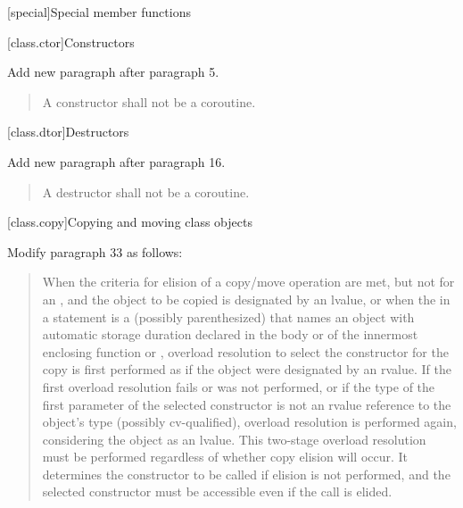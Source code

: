 
\setcounter{chapter}{11}
[special]{Special member functions}

\cbstart
{}

\begin{quote}
	\setcounter{Paras}{5} 
\end{quote}

\setcounter{section}{0}
[class.ctor]{Constructors}%

Add new paragraph after paragraph 5.

	\setcounter{Paras}{5}
\begin{quote}
	\pnum A constructor shall not be a coroutine.
\end{quote}

\setcounter{section}{3}
[class.dtor]{Destructors}%

Add new paragraph after paragraph 16.

	\setcounter{Paras}{16}
\begin{quote}
	\pnum A destructor shall not be a coroutine.
\end{quote}
\cbend

\setcounter{section}{7}
[class.copy]{Copying and moving class objects}%

Modify paragraph 33 as follows:

\begin{quote}
\setcounter{Paras}{32}
\pnum
When the criteria for elision of a copy/move operation are met,
but not for an ,
and the object
to be copied is designated by an lvalue,
or when the  in a    statement
is a (possibly parenthesized) 
that names an object with automatic storage duration declared in the body
or  of the innermost enclosing
function or ,
overload resolution to select the constructor
for the copy  is first performed as if the object were designated by an rvalue.
If the first overload resolution fails or was not performed,
or if the type of the first parameter of the selected
constructor is not an rvalue reference to the object's type (possibly cv-qualified),
overload resolution is performed again, considering the object as an lvalue.
\enternote This two-stage overload resolution must be performed regardless
of whether copy elision will occur. It determines the constructor to be called if
elision is not performed, and the selected constructor must be accessible even if
the call is elided. \exitnote
\end{quote}